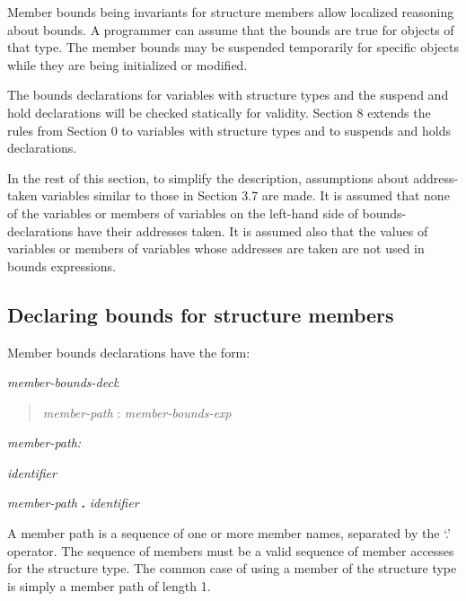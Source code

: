 \documentclass[]{article}
\begin{document}
Member bounds being invariants for structure members allow localized
reasoning about bounds. A programmer can assume that the bounds are true
for objects of that type. The member bounds may be suspended temporarily
for specific objects while they are being initialized or modified.

The bounds declarations for variables with structure types and the
suspend and hold declarations will be checked statically for validity.
Section 8 extends the rules from Section 0 to variables with structure
types and to suspends and holds declarations.

In the rest of this section, to simplify the description, assumptions
about address-taken variables similar to those in Section 3.7 are made.
It is assumed that none of the variables or members of variables on the
left-hand side of bounds-declarations have their addresses taken. It is
assumed also that the values of variables or members of variables whose
addresses are taken are not used in bounds expressions.

\subsection{\texorpdfstring{\protect\hypertarget{ux5fToc420589197}{}{\protect\hypertarget{ux5fToc422906988}{}{\protect\hypertarget{ux5fToc424307703}{}{\protect\hypertarget{ux5fToc426641093}{}{\protect\hypertarget{ux5fToc435434975}{}{\protect\hypertarget{ux5fToc437460806}{}{\protect\hypertarget{ux5fToc440445487}{}{\protect\hypertarget{ux5fToc440449269}{}{\protect\hypertarget{ux5fToc440551919}{}{}}}}}}}}}Declaring
bounds for structure
members}{Declaring bounds for structure members}}\label{declaring-bounds-for-structure-members}

Member bounds declarations have the form:

\emph{member-bounds-decl}:

\begin{quote}
\emph{member-path} : \emph{member-bounds-exp}
\end{quote}

\emph{member-path:}

\emph{identifier}

\emph{member-path} \textbf{.} \emph{identifier}

A member path is a sequence of one or more member names, separated by
the `.' operator. The sequence of members must be a valid sequence of
member accesses for the structure type. The common case of using a
member of the structure type is simply a member path of length 1.
\end{document}
